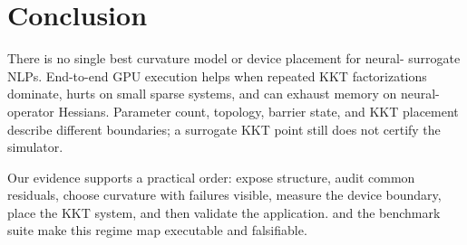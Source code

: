 \section{Conclusion}

There is no single best curvature model or device placement for neural-
surrogate NLPs.  End-to-end GPU execution helps when repeated KKT
factorizations dominate, hurts on small sparse systems, and can exhaust memory
on neural-operator Hessians.  Parameter count, topology, barrier state, and KKT
placement describe different boundaries; a surrogate KKT point still does not
certify the simulator.

Our evidence supports a practical order: expose structure, audit common
residuals, choose curvature with failures visible, measure the device boundary,
place the KKT system, and then validate the application.  \method{} and the
benchmark suite make this regime map executable and falsifiable.
